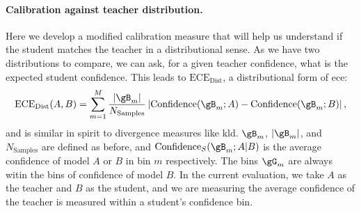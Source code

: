 \paragraph{Calibration against teacher distribution.} 
Here we develop a modified calibration measure that will help us understand if the student matches the teacher in a distributional sense.
As we have two distributions to compare, we can ask, for a given teacher confidence, what is the expected student confidence.
This leads to $\mathrm{ECE}_{\mathrm{Dist}}$, a distributional form of \gls{ece}:
\begin{align}
\label{eq:ece-dist}
    \mathrm{ECE}_{\mathrm{Dist}}(A,B) =
    \sum_{m=1}^{M} \frac{|\gB_m|}{N_{\mathrm{Samples}}} \left| \mathrm{Confidence}(\gB_m; A) - \mathrm{Confidence}(\gB_m; B) \right|,
\end{align}
and is similar in spirit to divergence measures like \gls{kld}.
$\gB_m$, $|\gB_m|$, and $N_{\mathrm{Samples}}$ are defined as before,
and $\text{Confidence}_S(\gB_m;A|B)$
is the average confidence of model $A$ or $B$ in bin $m$ respectively. 
The bins $\gG_m$ are always witin the bins of confidence of model $B$.
In the current evaluation, we take $A$ as the teacher and $B$ as the student,
and we are measuring the average confidence of the teacher is measured within a student's confidence bin.
